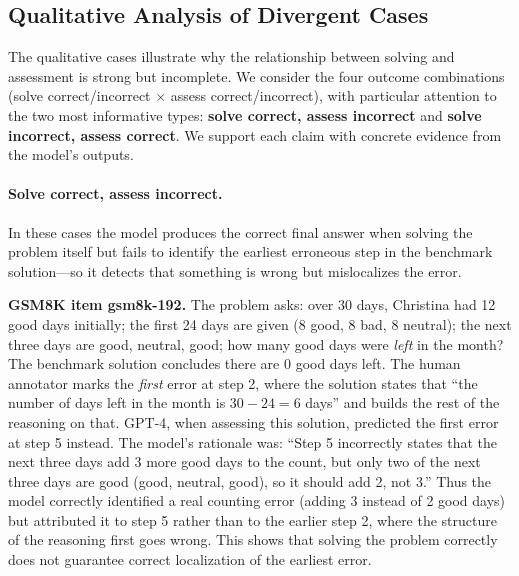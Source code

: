 
\subsection{Qualitative Analysis of Divergent Cases}

The qualitative cases illustrate why the relationship between solving and assessment is strong but incomplete. We consider the four outcome combinations (solve correct/incorrect $\times$ assess correct/incorrect), with particular attention to the two most informative types: \textbf{solve correct, assess incorrect} and \textbf{solve incorrect, assess correct}. We support each claim with concrete evidence from the model's outputs.

\paragraph{Solve correct, assess incorrect.}
In these cases the model produces the correct final answer when solving the problem itself but fails to identify the earliest erroneous step in the benchmark solution---so it detects that something is wrong but mislocalizes the error.

\textbf{GSM8K item gsm8k-192.} The problem asks: over 30 days, Christina had 12 good days initially; the first 24 days are given (8 good, 8 bad, 8 neutral); the next three days are good, neutral, good; how many good days were \emph{left} in the month? The benchmark solution concludes there are 0 good days left. The human annotator marks the \emph{first} error at step 2, where the solution states that ``the number of days left in the month is $30 - 24 = 6$ days'' and builds the rest of the reasoning on that. GPT-4, when assessing this solution, predicted the first error at step 5 instead. The model's rationale was: ``Step 5 incorrectly states that the next three days add 3 more good days to the count, but only two of the next three days are good (good, neutral, good), so it should add 2, not 3.'' Thus the model correctly identified a real counting error (adding 3 instead of 2 good days) but attributed it to step 5 rather than to the earlier step 2, where the structure of the reasoning first goes wrong. This shows that solving the problem correctly does not guarantee correct localization of the earliest error.

